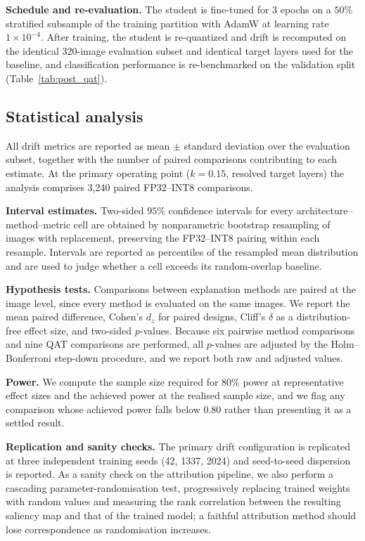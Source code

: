 \documentclass[fleqn,10pt]{wlscirep}
\begin{document}
\textbf{Schedule and re-evaluation.} The student is fine-tuned for 3 epochs on a $50\%$ stratified subsample of the training partition with AdamW at learning rate $1 \times 10^{-4}$. After training, the student is re-quantized and drift is recomputed on the identical 320-image evaluation subset and identical target layers used for the baseline, and classification performance is re-benchmarked on the validation split (Table~\ref{tab:post_qat}).

\subsection*{Statistical analysis}

All drift metrics are reported as mean $\pm$ standard deviation over the evaluation subset, together with the number of paired comparisons contributing to each estimate. At the primary operating point ($k = 0.15$, resolved target layers) the analysis comprises 3{,}240 paired FP32--INT8 comparisons.

\textbf{Interval estimates.} Two-sided $95\%$ confidence intervals for every architecture--method--metric cell are obtained by nonparametric bootstrap resampling of images with replacement, preserving the FP32--INT8 pairing within each resample. Intervals are reported as percentiles of the resampled mean distribution and are used to judge whether a cell exceeds its random-overlap baseline.

\textbf{Hypothesis tests.} Comparisons between explanation methods are paired at the image level, since every method is evaluated on the same images. We report the mean paired difference, Cohen's $d_z$ for paired designs, Cliff's $\delta$ as a distribution-free effect size, and two-sided $p$-values. Because six pairwise method comparisons and nine QAT comparisons are performed, all $p$-values are adjusted by the Holm--Bonferroni step-down procedure, and we report both raw and adjusted values.

\textbf{Power.} We compute the sample size required for $80\%$ power at representative effect sizes and the achieved power at the realised sample size, and we flag any comparison whose achieved power falls below $0.80$ rather than presenting it as a settled result.

\textbf{Replication and sanity checks.} The primary drift configuration is replicated at three independent training seeds (42, 1337, 2024) and seed-to-seed dispersion is reported. As a sanity check on the attribution pipeline, we also perform a cascading parameter-randomisation test, progressively replacing trained weights with random values and measuring the rank correlation between the resulting saliency map and that of the trained model; a faithful attribution method should lose correspondence as randomisation increases.
\end{document}
